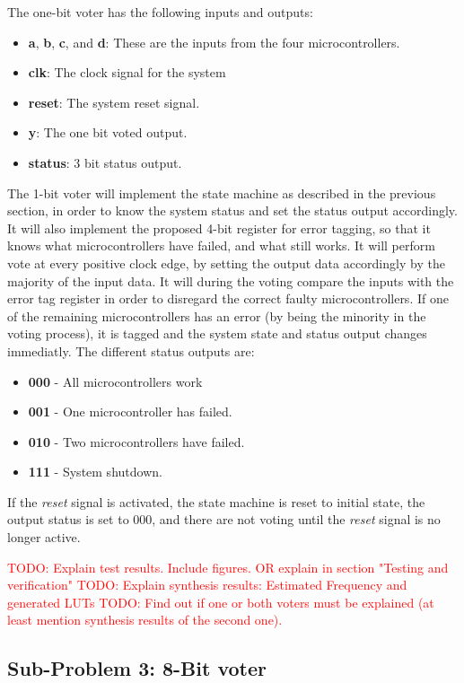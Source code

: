 \documentclass[a4paper]{IEEEtran}
\newcommand\TODO[1]{\textcolor{red}{TODO:#1}}
\newcommand\todo[1]{\TODO{#1}}
\begin{document}
The one-bit voter has the following inputs and outputs:
\begin{itemize}
    \item \textbf{a}, \textbf{b}, \textbf{c}, and \textbf{d}: These are the inputs from the four microcontrollers.
    \item \textbf{clk}: The clock signal for the system
    \item \textbf{reset}: The system reset signal.
    \item \textbf{y}: The one bit voted output.
    \item \textbf{status}: 3 bit status output.
\end{itemize}

The 1-bit voter will implement the state machine as described in the previous section, in order to know the system status and set the status output accordingly.
It will also implement the proposed 4-bit register for error tagging, so that it knows what microcontrollers have failed, and what still works.
It will perform vote at every positive clock edge, by setting the output data accordingly by the majority of the input data.
It will during the voting compare the inputs with the error tag register in order to disregard the correct faulty microcontrollers.
If one of the remaining microcontrollers has an error (by being the minority in the voting process), it is tagged and the system state and status output changes immediatly.
The different status outputs are:
\begin{itemize}
    \item \textbf{000} - All microcontrollers work
    \item \textbf{001} - One microcontroller has failed.
    \item \textbf{010} - Two microcontrollers have failed.
    \item \textbf{111} - System shutdown.
\end{itemize}
If the \textit{reset} signal is activated, the state machine is reset to initial state, the output status is set to 000, and there are not voting until the \textit{reset} signal is no longer active. 

\todo{ Explain test results. Include figures. OR explain in section "Testing and verification" }
\break
\break
\todo{ Explain synthesis results: Estimated Frequency and generated LUTs}
\break
\todo{ Find out if one or both voters must be explained (at least mention synthesis results of the second one). }

\subsection{Sub-Problem 3: 8-Bit voter}
\end{document}

